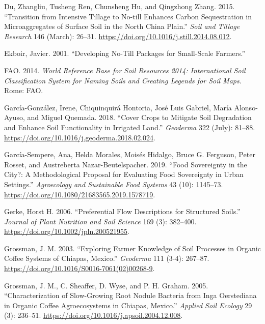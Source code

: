 \documentclass[
  12pt,
]{article}
\newlength{\cslhangindent}
\newlength{\cslentryspacingunit} %
\newenvironment{CSLReferences}[2] %
 {%
  \setlength{\parindent}{0pt}
  \ifodd #1
  \let\oldpar\par
  \def\par{\hangindent=\cslhangindent\oldpar}
  \fi
  \setlength{\parskip}{#2\cslentryspacingunit}
 }%
 {}
\begin{document}
\begin{CSLReferences}{1}{0}
\leavevmode{}%
Du, Zhangliu, Tusheng Ren, Chunsheng Hu, and Qingzhong Zhang. 2015. {``Transition from Intensive Tillage to No-till Enhances Carbon Sequestration in Microaggregates of Surface Soil in the {North China Plain}.''} \emph{Soil and Tillage Research} 146 (March): 26--31. \url{https://doi.org/10.1016/j.still.2014.08.012}.

\leavevmode{}%
Ekboir, Javier. 2001. {``Developing {No-Till Packages} for {Small-Scale Farmers}.''}

\leavevmode{}%
FAO. 2014. \emph{World Reference Base for Soil Resources 2014: International Soil Classification System for Naming Soils and Creating Legends for Soil Maps}. {Rome}: {FAO}.

\leavevmode{}%
García-González, Irene, Chiquinquirá Hontoria, José Luis Gabriel, María Alonso-Ayuso, and Miguel Quemada. 2018. {``Cover Crops to Mitigate Soil Degradation and Enhance Soil Functionality in Irrigated Land.''} \emph{Geoderma} 322 (July): 81--88. \url{https://doi.org/10.1016/j.geoderma.2018.02.024}.

\leavevmode{}%
García-Sempere, Ana, Helda Morales, Moisés Hidalgo, Bruce G. Ferguson, Peter Rosset, and Austreberta Nazar-Beutelspacher. 2019. {``Food {Sovereignty} in the City?: {A} Methodological Proposal for Evaluating Food Sovereignty in Urban Settings.''} \emph{Agroecology and Sustainable Food Systems} 43 (10): 1145--73. \url{https://doi.org/10.1080/21683565.2019.1578719}.

\leavevmode{}%
Gerke, Horst H. 2006. {``Preferential Flow Descriptions for Structured Soils.''} \emph{Journal of Plant Nutrition and Soil Science} 169 (3): 382--400. \url{https://doi.org/10.1002/jpln.200521955}.

\leavevmode{}%
Grossman, J. M. 2003. {``Exploring Farmer Knowledge of Soil Processes in Organic Coffee Systems of {Chiapas}, {Mexico}.''} \emph{Geoderma} 111 (3-4): 267--87. \url{https://doi.org/10.1016/S0016-7061(02)00268-9}.

\leavevmode{}%
Grossman, J. M., C. Sheaffer, D. Wyse, and P. H. Graham. 2005. {``Characterization of Slow-Growing Root Nodule Bacteria from {Inga} Oerstediana in Organic Coffee Agroecosystems in {Chiapas}, {Mexico}.''} \emph{Applied Soil Ecology} 29 (3): 236--51. \url{https://doi.org/10.1016/j.apsoil.2004.12.008}.


\end{CSLReferences}
\end{document}
